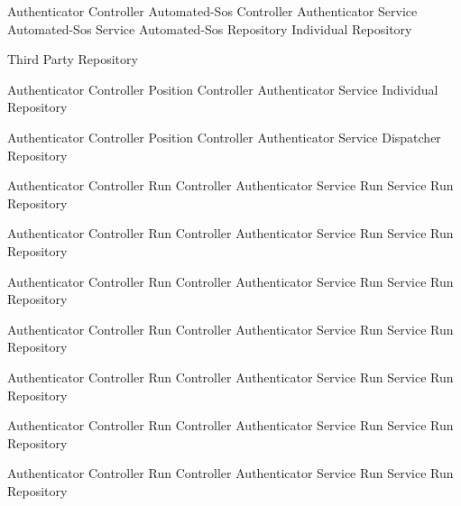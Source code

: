 \documentclass[a4paper]{article}
\begin{document}
\begin{description}
     {Authenticator Controller}
     {Automated-Sos Controller}
     {Authenticator Service}
     {Automated-Sos Service}
     {Automated-Sos Repository}
     {Individual Repository}
     
     {Third Party Repository}
     
     {Authenticator Controller}
     {Position Controller}
     {Authenticator Service}
     {Individual Repository}
     
     {Authenticator Controller}
     {Position Controller}
     {Authenticator Service}
     {Dispatcher Repository}
     
     {Authenticator Controller}
     {Run Controller}
     {Authenticator Service}
     {Run Service}
     {Run Repository}
     
     {Authenticator Controller}
     {Run Controller}
     {Authenticator Service}
     {Run Service}
     {Run Repository}
     
     {Authenticator Controller}
     {Run Controller}
     {Authenticator Service}
     {Run Service}
     {Run Repository}
     
     {Authenticator Controller}
     {Run Controller}
     {Authenticator Service}
     {Run Service}
     {Run Repository}
     
     {Authenticator Controller}
     {Run Controller}
     {Authenticator Service}
     {Run Service}
     {Run Repository}
     
     {Authenticator Controller}
     {Run Controller}
     {Authenticator Service}
     {Run Service}
     {Run Repository}
     
     {Authenticator Controller}
     {Run Controller}
     {Authenticator Service}
     {Run Service}
     {Run Repository}
     
\end{description}
\end{document}
